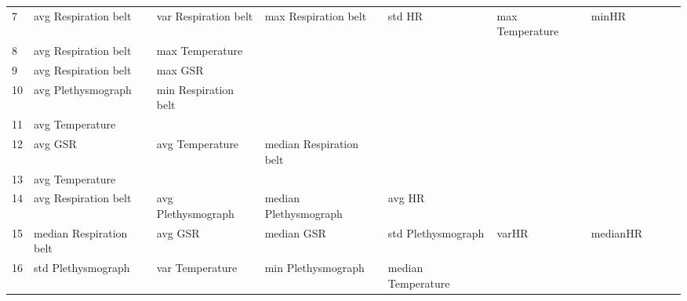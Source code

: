 \begin{landscape}
\begin{table}[]
\begin{tabular}{l|llllllll}
7        & avg Respiration belt    & var Respiration belt  & max Respiration belt    & std HR                  & max Temperature         & minHR                 &                      &          &                      &        \\
8        & avg Respiration belt    & max Temperature       &                         &                         &                         &                       &                      &          &                      &        \\
9        & avg Respiration belt    & max GSR               &                         &                         &                         &                       &                      &          &                      &        \\
10       & avg Plethysmograph      & min Respiration belt  &                         &                         &                         &                       &                      &          &                      &        \\
11       & avg Temperature         &                       &                         &                         &                         &                       &                      &          &                      &        \\
12       & avg GSR                 & avg Temperature       & median Respiration belt &                         &                         &                       &                      &          &                      &        \\
13       & avg Temperature         &                       &                         &                         &                         &                       &                      &          &                      &        \\
14       & avg Respiration belt    & avg Plethysmograph    & median Plethysmograph   & avg HR                  &                         &                       &                      &          &                      &        \\
15       & median Respiration belt & avg GSR               & median GSR              & std Plethysmograph      & varHR                   & medianHR              &                      &          &                      &        \\
16       & std Plethysmograph      & var Temperature       & min Plethysmograph      & median Temperature      &                         &                       &                      &          &                      &        \\

\end{tabular}
\end{table}
\end{landscape}
